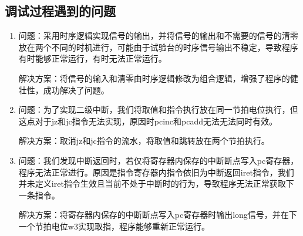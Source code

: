 \subsection{调试过程遇到的问题}
\begin{enumerate}[(1)]
    \item 问题：采用时序逻辑实现信号的输出，并将信号的输出和不需要的信号的清零放在两个不同的时机进行，可能由于试验台的时序信号输出不稳定，导致程序有时能够正常运行，有时无法正常运行。
    \par 解决方案：将信号的输入和清零由时序逻辑修改为组合逻辑，增强了程序的健壮性，成功解决了问题。
    \item 问题：为了实现二级中断，我们将取值和指令执行放在同一节拍电位执行，但这点对于jz和jc指令无法实现，原因时pcinc和pcadd无法无法同时有效。
    \par 解决方案：取消jz和jc指令的流水，将取值和跳转放在两个节拍执行。
    \item 问题：我们发现中断返回时，若仅将寄存器内保存的中断断点写入pc寄存器，程序无法正常进行。原因是指令寄存器内指令依旧为中断返回iret指令，我们并未定义iret指令生效且当前不处于中断时的行为，导致程序无法正常获取下一条指令。
    \par 解决方案：将寄存器内保存的中断断点写入pc寄存器时输出long信号，并在下一个节拍电位w3实现取指，程序能够重新正常运行。
\end{enumerate}